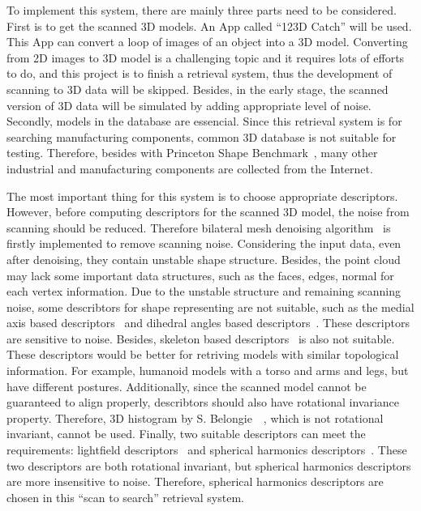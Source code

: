 To implement this system, there are mainly three parts need to be considered. First is to get the scanned 3D models. An App called ``123D Catch'' will be used. This App can convert a loop of images of an object into a 3D model. Converting from 2D images to 3D model is a challenging topic and it requires lots of efforts to do, and this project is to finish a retrieval system, thus the development of scanning to 3D data will be skipped. Besides, in the early stage, the scanned version of 3D data will be simulated by adding appropriate level of noise. Secondly, models in the database are essencial. Since this retrieval system is for searching  manufacturing components, common 3D database is not suitable for testing. Therefore, besides with  Princeton Shape Benchmark~\cite{shilane2004princeton}, many other industrial and manufacturing components are collected from the Internet.

The most important thing for this system is to choose appropriate descriptors. However, before computing descriptors for the scanned 3D model, the noise from scanning should be reduced. Therefore bilateral mesh denoising algorithm~\cite{fleishman2003bilateral} is firstly implemented to remove scanning noise. Considering the input data, even after denoising, they contain unstable shape structure. Besides, the point cloud may lack some important data structures, such as the faces, edges, normal for each vertex information. Due to the unstable structure and remaining scanning noise, some describtors for shape representing are not suitable, such as the medial axis based descriptors~\cite{kim2001graph} and dihedral angles based descriptors~\cite{gal2009iwires}. These descriptors are sensitive to noise. Besides, skeleton based descriptors~\cite{sundar2003skeleton} is also not suitable. These descriptors would be better for retriving models with similar topological information. For example, humanoid models with a torso and arms and legs, but have different postures. Additionally, since the scanned model cannot be guaranteed to align properly, describtors should also have rotational invariance property. Therefore, 3D histogram by S. Belongie~\etal~\cite{belongie2002shape}, which is not rotational invariant, cannot be used. Finally, two suitable descriptors can meet the requirements: lightfield descriptors~\cite{shen20033d} and spherical harmonics descriptors~\cite{Funkhouser:2003:SEM:588272.588279}. These two descriptors are both rotational invariant, but spherical harmonics descriptors are more insensitive to noise. Therefore, spherical harmonics descriptors are chosen in this ``scan to search'' retrieval system. 

